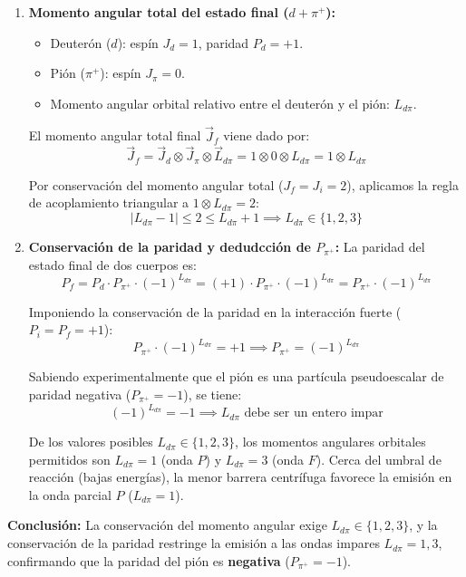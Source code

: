 \begin{problema}
\begin{enumerate}[label=\arabic*.]
    \item \textbf{Momento angular total del estado final ($d + \pi^+$):}
    \begin{itemize}
        \item Deuterón ($d$): espín $J_d = 1$, paridad $P_d = +1$.
        \item Pión ($\pi^+$): espín $J_\pi = 0$.
        \item Momento angular orbital relativo entre el deuterón y el pión: $L_{d\pi}$.
    \end{itemize}
    
    El momento angular total final $\vec{J}_f$ viene dado por:
    \begin{equation*}
        \vec{J}_f = \vec{J}_d \otimes \vec{J}_\pi \otimes \vec{L}_{d\pi} = 1 \otimes 0 \otimes L_{d\pi} = 1 \otimes L_{d\pi}
    \end{equation*}
    
    Por conservación del momento angular total ($J_f = J_i = 2$), aplicamos la regla de acoplamiento triangular a $1 \otimes L_{d\pi} = 2$:
    \begin{equation*}
        |L_{d\pi} - 1| \le 2 \le L_{d\pi} + 1 \implies L_{d\pi} \in \{1, 2, 3\}
    \end{equation*}

    \item \textbf{Conservación de la paridad y dedudcción de $P_{\pi^+}$:}
    La paridad del estado final de dos cuerpos es:
    \begin{equation*}
        P_f = P_d \cdot P_{\pi^+} \cdot (-1)^{L_{d\pi}} = (+1) \cdot P_{\pi^+} \cdot (-1)^{L_{d\pi}} = P_{\pi^+} \cdot (-1)^{L_{d\pi}}
    \end{equation*}

    Imponiendo la conservación de la paridad en la interacción fuerte ($P_i = P_f = +1$):
    \begin{equation*}
        P_{\pi^+} \cdot (-1)^{L_{d\pi}} = +1 \implies P_{\pi^+} = (-1)^{L_{d\pi}}
    \end{equation*}

    Sabiendo experimentalmente que el pión es una partícula pseudoescalar de paridad negativa ($P_{\pi^+} = -1$), se tiene:
    \begin{equation*}
        (-1)^{L_{d\pi}} = -1 \implies L_{d\pi} \text{ debe ser un entero impar}
    \end{equation*}

    De los valores posibles $L_{d\pi} \in \{1, 2, 3\}$, los momentos angulares orbitales permitidos son \textbf{$L_{d\pi} = 1$} (onda $P$) y \textbf{$L_{d\pi} = 3$} (onda $F$). Cerca del umbral de reacción (bajas energías), la menor barrera centrífuga favorece la emisión en la onda parcial $P$ ($L_{d\pi} = 1$).
\end{enumerate}

\textbf{Conclusión:} La conservación del momento angular exige $L_{d\pi} \in \{1, 2, 3\}$, y la conservación de la paridad restringe la emisión a las ondas impares $L_{d\pi} = 1, 3$, confirmando que la paridad del pión es \textbf{negativa} ($P_{\pi^+} = -1$).
\end{problema}
